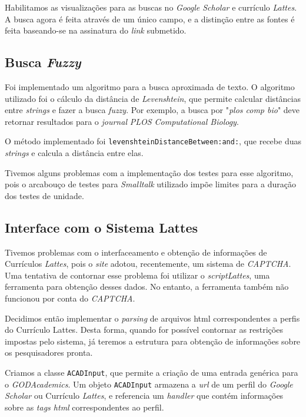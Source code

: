 \documentclass[12pt]{article}
\begin{document}
Habilitamos as visualizações para as buscas no \emph{Google Scholar}
e currículo \emph{Lattes}. A busca agora é feita através de um único
campo, e a distinção entre as fontes é feita baseando-se na assinatura
do \emph{link} submetido.

\subsection{Busca \emph{Fuzzy}}

Foi implementado um algoritmo para a busca aproximada de texto.
O algoritmo utilizado foi o cálculo da distância de \emph{Levenshtein},
que permite calcular distâncias entre \emph{strings} e fazer a busca
\emph{fuzzy}. Por exemplo, a busca por "\emph{plos comp bio}" deve retornar
resultados para o \emph{journal} \emph{PLOS Computational Biology}.

O método implementado foi \texttt{levenshteinDistanceBetween:and:},
que recebe duas \emph{strings} e calcula a distância entre elas.

Tivemos alguns problemas com a implementação dos testes para esse algoritmo,
pois o arcabouço de testes para \emph{Smalltalk} utilizado impõe limites
para a duração dos testes de unidade.

\subsection{Interface com o Sistema Lattes}

Tivemos problemas com o interfaceamento e obtenção de informações
de Currículos \emph{Lattes}, pois o \emph{site} adotou, recentemente,
um sistema de \emph{CAPTCHA}. Uma tentativa de contornar esse problema
foi utilizar o \emph{scriptLattes}, uma ferramenta para obtenção desses dados.
No entanto, a ferramenta também não funcionou por conta do \emph{CAPTCHA}.

Decidimos então implementar o \emph{parsing} de arquivos html correspondentes
a perfis do Currículo Lattes. Desta forma, quando for possível contornar as
restrições impostas pelo sistema, já teremos a estrutura para obtenção de 
informações sobre os pesquisadores pronta.

Criamos a classe \texttt{ACADInput}, que permite a criação de uma entrada
genérica para o \emph{GODAcademics}. Um objeto \texttt{ACADInput} armazena
a \emph{url} de um perfil do \emph{Google Scholar} ou Currículo \emph{Lattes},
e referencia um \emph{handler} que contém informações sobre as \emph{tags html}
correspondentes ao perfil.
\end{document}
